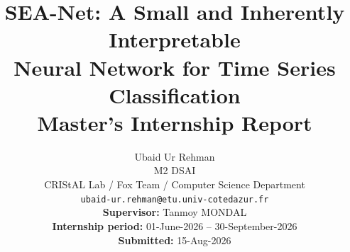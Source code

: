 \documentclass{article}
\title{SEA-Net: A Small and Inherently Interpretable\\
       Neural Network for Time Series Classification\\[6pt]
       \large Master's Internship Report}
\author{
Ubaid Ur Rehman \\
{M2 DSAI} \\
{CRIStAL Lab / Fox Team / Computer Science Department} \\
\texttt{ubaid-ur.rehman@etu.univ-cotedazur.fr} \\[4pt]
\textbf{Supervisor:} {Tanmoy MONDAL} \\
\textbf{Internship period:} {01-June-2026} -- {30-September-2026} \\
\textbf{Submitted:} {15-Aug-2026}
}
\begin{document}
\maketitle

\lhead{}\chead{}\rhead{}

\begin{abstract}

\end{abstract}

\setcounter{tocdepth}{2}
\newpage           %
\begingroup
  \small
  \setlength{\parskip}{0pt}
  \makeatletter
  \renewcommand*\l@section[2]{%
    \ifnum \c@tocdepth >\z@
      \addpenalty\@secpenalty
      \addvspace{0.35em \@plus\p@}%
      \setlength\@tempdima{1.5em}%
      \begingroup
        \parindent\z@ \rightskip\@pnumwidth
        \parfillskip-\@pnumwidth
        \leavevmode\bfseries
        \advance\leftskip\@tempdima \hskip-\leftskip
        #1\nobreak\hfil\nobreak\hb@xt@\@pnumwidth{\hss #2}\par
      \endgroup
    \fi}
  \makeatother
  \tableofcontents
\endgroup
\newpage








\end{document}
